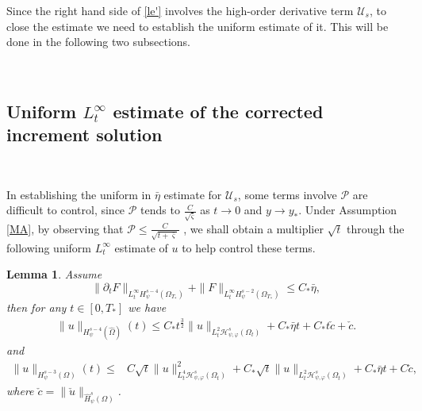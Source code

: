 \documentclass{amsart}
\numberwithin{equation}{section}
\newtheorem{lemma}{Lemma}[section]
\begin{document}
Since the right hand side of \eqref{le'} involves the high-order derivative term $\mathcal{U}_{s}$, to close the estimate we need to establish the uniform estimate of it. This will be done in the following two subsections.

~~~~~~~~~~

\subsection{Uniform $L_{t}^{\infty}$ estimate of the corrected increment solution}~

In establishing the uniform in $\bar{\eta}$ estimate for $\mathcal{U}_{s}$, some terms involve $\mathcal{P}$ are difficult to control, since $\mathcal{P}$ tends to $\frac{C}{\sqrt{\bar{\varsigma}}}$ as $t\to0$ and $y\to y_{*}$. Under Assumption \ref{MA}, by observing that $\mathcal{P}\leq\frac{C}{\sqrt{t+\bar{\varsigma}}}$ , we shall obtain a multiplier $\sqrt{t}$ through the following uniform $L_{t}^{\infty}$ estimate of $u$ to help control these terms.
\begin{lemma}\label{Lt}
Assume
$$\|\partial_{t}F\|_{L_{t}^{\infty}H_{\psi}^{s-4}(\Omega_{T_{*}})}+\|F\|_{L_{t}^{\infty}H_{\psi}^{s-2}(\Omega_{T_{*}})}
\leq C_{*}\bar{\eta},$$
then for any $t\in[0,T_{*}]$ we have
\begin{align}\label{ltp}
\|u\|_{H_{\psi}^{s-4}(\hat{\Omega})}(t)
\leq C_{*}t^{\frac{3}{2}}\|u\|_{L_{t}^{2}\mathcal{H}_{\psi,\varphi}^{s}(\Omega_{t})}
     +C_{*}\bar{\eta}t
     +C_{*}t\check{c}+\check{c}.
\end{align}
and
\begin{align}\label{lt}
\|u\|_{H_{\psi}^{s-3}(\Omega)}(t)
\leq& C\sqrt{t}\|u\|_{L_{t}^{4}\mathcal{H}_{\psi,\varphi}^{s}(\Omega_{t})}^{2}
     +C_{*}\sqrt{t}\|u\|_{L_{t}^{2}\mathcal{H}_{\psi,\varphi}^{s}(\Omega_{t})}
     +C_{*}\bar{\eta}t
     +C\check{c},
\end{align}
where $\check{c}=\|\check{u}\|_{\hat{H}_{\psi}^{s}(\Omega)}$.


\end{lemma}
\end{document}
